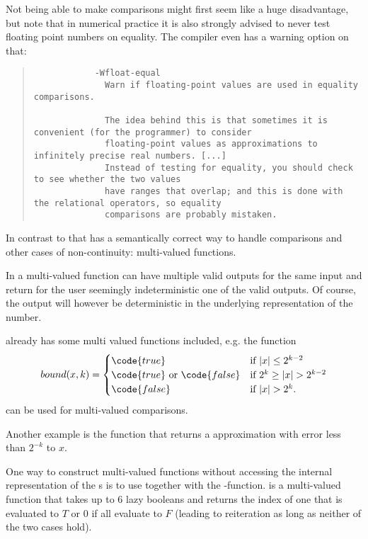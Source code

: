     Not being able to make comparisons might first seem like a huge
    disadvantage, but note that in numerical practice it is also strongly
    advised to never test floating point numbers on equality.  The  compiler even has a warning option on that:
		\begin{quotation}
				\noindent
		\begin{verbatim}
			-Wfloat-equal
			  Warn if floating-point values are used in equality comparisons.

			  The idea behind this is that sometimes it is convenient (for the programmer) to consider 
			  floating-point values as approximations to infinitely precise real numbers. [...]
			  Instead of testing for equality, you should check to see whether the two values 
			  have ranges that overlap; and this is done with the relational operators, so equality 
			  comparisons are probably mistaken. 
		    \end{verbatim}
		\end{quotation} 

		In contrast to that \irram has a semantically correct way to handle comparisons and other
		cases of non-continuity: multi-valued functions.

		In \irram a multi-valued function can have multiple valid outputs for the same input and 
		return for the user seemingly indeterministic one of the valid outputs.  
    Of course, the output will however be deterministic in the underlying
    representation of the number.
		
		\irram already has some multi valued functions included, e.g. the function
		\begin{equation*}
			bound(x,k) = 
			\begin{cases}
				\code{true} & \mbox{if } | x | \leq 2^{k-2} \\
				\code{true} \mbox{ or } \code{false} & \mbox{if } 2^k \geq |x| > 2^{k-2} \\
				 \code{false}  & \mbox{if } |x| > 2^k.
			\end{cases}
		\end{equation*}
		can be used for multi-valued comparisons.

		Another example is the function  that returns a  
		approximation with error less than $2^{-k}$ to $x$.	

		One way to construct multi-valued functions without accessing the internal representation of the {\real}s 
		is to use  together with the -function.
		 is a multi-valued function that takes up to 6 lazy booleans and returns the index of one 
		that is evaluated to $T$ or $0$ if all evaluate to $F$ (leading to reiteration as long as neither of the two cases hold).

